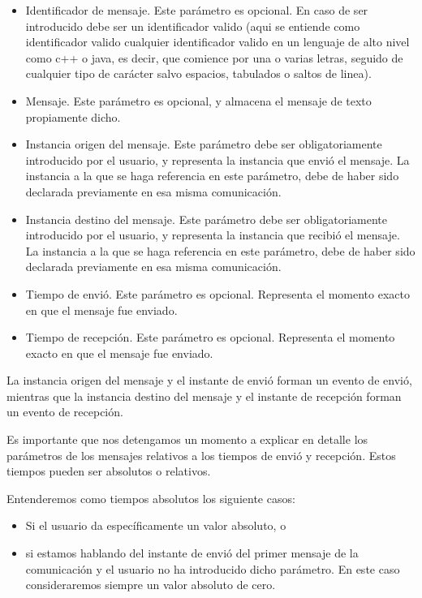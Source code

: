 \documentclass{article}
\begin{document}
\begin{itemize}
\item Identificador de mensaje. Este parámetro es opcional. En caso de ser introducido debe ser un identificador valido (aqui se entiende como identificador valido cualquier identificador valido en un lenguaje de alto nivel como c++ o java, es decir, que comience por una o varias letras, seguido de cualquier tipo de carácter salvo espacios, tabulados o saltos de linea).
\item Mensaje. Este parámetro es opcional, y almacena el mensaje de texto propiamente dicho.
\item Instancia origen del mensaje. Este parámetro debe ser obligatoriamente introducido por el usuario, y representa la instancia que envió el mensaje. La instancia a la que se haga referencia en este parámetro, debe de haber sido declarada previamente en esa misma comunicación.
\item Instancia destino del mensaje. Este parámetro debe ser obligatoriamente introducido por el usuario, y representa la instancia que recibió el mensaje. La instancia a la que se haga referencia en este parámetro, debe de haber sido declarada previamente en esa misma comunicación.
\item Tiempo de envió. Este parámetro es opcional. Representa el momento exacto en que el mensaje fue enviado.
\item Tiempo de recepción. Este parámetro es opcional. Representa el momento exacto en que el mensaje fue enviado.
\end{itemize}

La instancia origen del mensaje y el instante de envió forman un evento de envió, mientras que la instancia destino del mensaje y el instante de recepción forman un evento de recepción.

Es importante que nos detengamos un momento a explicar en detalle los parámetros de los mensajes relativos a los tiempos de envió y recepción. Estos tiempos pueden ser absolutos o relativos. 

Entenderemos como tiempos absolutos los siguiente casos:

\begin{itemize}
\item Si el usuario da específicamente un valor absoluto, o
\item si estamos hablando del instante de envió del primer mensaje de la comunicación y el usuario no ha introducido dicho parámetro. En este caso consideraremos siempre un valor absoluto de cero. 
\end{itemize}
\end{document}
